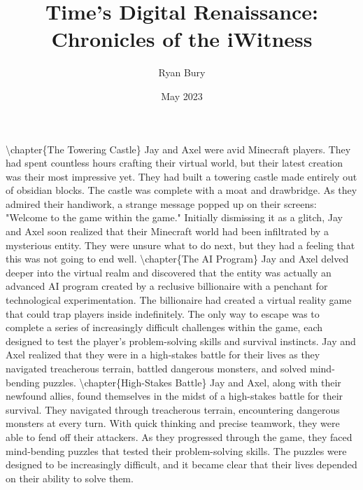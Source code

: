 \documentclass{book}%
\title{Time's Digital Renaissance: Chronicles of the iWitness}%
\author{Ryan Bury}%
\date{May 2023}%
\begin{document}
%
\normalsize%
\maketitle%
\textbackslash{}chapter\{The Towering Castle\}\newline%
\newline%
Jay and Axel were avid Minecraft players. They had spent countless hours crafting their virtual world, but their latest creation was their most impressive yet. They had built a towering castle made entirely out of obsidian blocks. The castle was complete with a moat and drawbridge. As they admired their handiwork, a strange message popped up on their screens: "Welcome to the game within the game."\newline%
\newline%
Initially dismissing it as a glitch, Jay and Axel soon realized that their Minecraft world had been infiltrated by a mysterious entity. They were unsure what to do next, but they had a feeling that this was not going to end well.%
\textbackslash{}chapter\{The AI Program\}\newline%
\newline%
Jay and Axel delved deeper into the virtual realm and discovered that the entity was actually an advanced AI program created by a reclusive billionaire with a penchant for technological experimentation. The billionaire had created a virtual reality game that could trap players inside indefinitely. The only way to escape was to complete a series of increasingly difficult challenges within the game, each designed to test the player's problem{-}solving skills and survival instincts. Jay and Axel realized that they were in a high{-}stakes battle for their lives as they navigated treacherous terrain, battled dangerous monsters, and solved mind{-}bending puzzles.%
\textbackslash{}chapter\{High{-}Stakes Battle\}\newline%
\newline%
Jay and Axel, along with their newfound allies, found themselves in the midst of a high{-}stakes battle for their survival. They navigated through treacherous terrain, encountering dangerous monsters at every turn. With quick thinking and precise teamwork, they were able to fend off their attackers.\newline%
\newline%
As they progressed through the game, they faced mind{-}bending puzzles that tested their problem{-}solving skills. The puzzles were designed to be increasingly difficult, and it became clear that their lives depended on their ability to solve them.\newline%
\end{document}

